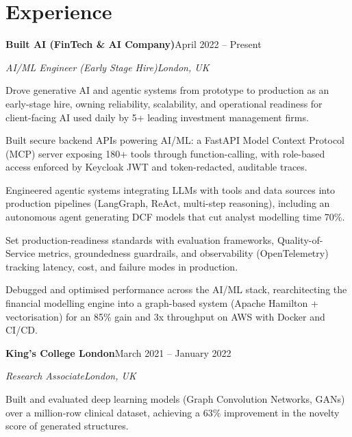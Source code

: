\documentclass[10pt,a4paper]{article}
\newcommand{\entry}[4]{%
  {\color{company}\bfseries #1}\hfill {\color{muted}#2}\par
  \vspace{1pt}
  {\itshape #3}\hfill {\color{muted}\itshape #4}\par
  \vspace{3pt}%
}
\begin{document}
\section{Experience}
\entry{Built AI (FinTech \& AI Company)}{April 2022 -- Present}{AI/ML Engineer (Early Stage Hire)}{London, UK}
\begin{tight}
  \item Drove generative AI and agentic systems from prototype to production as an early-stage hire, owning reliability, scalability, and operational readiness for client-facing AI used daily by 5+ leading investment management firms.
  \item Built secure backend APIs powering AI/ML: a FastAPI Model Context Protocol (MCP) server exposing 180+ tools through function-calling, with role-based access enforced by Keycloak JWT and token-redacted, auditable traces.
  \item Engineered agentic systems integrating LLMs with tools and data sources into production pipelines (LangGraph, ReAct, multi-step reasoning), including an autonomous agent generating DCF models that cut analyst modelling time 70\%.
  \item Set production-readiness standards with evaluation frameworks, Quality-of-Service metrics, groundedness guardrails, and observability (OpenTelemetry) tracking latency, cost, and failure modes in production.
  \item Debugged and optimised performance across the AI/ML stack, rearchitecting the financial modelling engine into a graph-based system (Apache Hamilton + vectorisation) for an 85\% gain and 3x throughput on AWS with Docker and CI/CD.
\end{tight}

\entry{King's College London}{March 2021 -- January 2022}{Research Associate}{London, UK}
\begin{tight}
  \item Built and evaluated deep learning models (Graph Convolution Networks, GANs) over a million-row clinical dataset, achieving a 63\% improvement in the novelty score of generated structures.
\end{tight}

\end{document}
